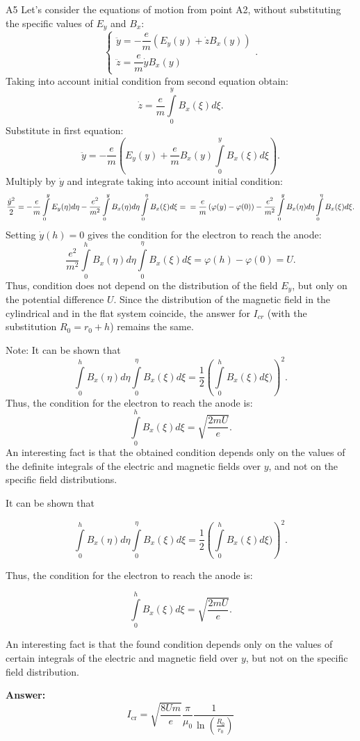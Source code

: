 \documentclass[11pt,a4paper]{article}
\begin{document}
\begin{solcard}{A5}
Let's consider the equations of motion from point A2, without substituting the specific values of $E_y$ and $B_x$: $$\begin{cases} \ddot{y} = -\dfrac{e}{m} \left(E_y(y) + \dot{z}B_x(y) \right) \\ \ddot{z} = \dfrac{e}{m} \dot{y}B_x(y) \end{cases}.$$ Taking into account initial condition from second equation obtain: $$\dot{z} = \frac{e}{m} \int \limits_0^y B_x(\xi) d\xi.$$Substitute in first equation: $$\ddot{y} = -\frac{e}{m}\left(E_y(y) + \frac{e}{m} B_x(y) \int \limits_0^y B_x(\xi) d\xi\right).$$Multiply by $\dot{y}$ and integrate taking into account initial condition: $$\frac{\dot{y}^2}{2} = -\frac{e}{m} \int \limits_0^y E_y(\eta) d\eta - \frac{e^2}{m^2} \int \limits_0^y B_x(\eta) d\eta \int \limits_0^\eta B_x(\xi) d\xi = \\ = \frac{e}{m}\left(\varphi(y) - \varphi(0)\right) - \frac{e^2}{m^2} \int \limits_0^y B_x(\eta) d\eta \int \limits_0^\eta B_x(\xi) d\xi.$$ Setting $\dot{y}(h) = 0$ gives the condition for the electron to reach the anode: $$\frac{e^2}{m^2} \int \limits_0^h B_x(\eta) d\eta \int \limits_0^\eta B_x(\xi) d\xi = \varphi(h) - \varphi(0) = U.$$Thus, condition does not depend on the distribution of the field $E_y$, but only on the potential difference $U$. Since the distribution of the magnetic field in the cylindrical and in the flat system coincide, the answer for $I_{cr}$ (with the substitution $R_0 = r_0 + h$) remains the same.


Note: It can be shown that $$\int \limits_0^h B_x(\eta) d\eta \int \limits_0^\eta B_x(\xi) d\xi = \frac{1}{2} \left(\int\limits_0^h B_x(\xi)d\xi)\right)^2.$$ Thus, the condition for the electron to reach the anode is: $$\int\limits_0^h B_x(\xi)d\xi = \sqrt{\frac{2mU}{e}}.$$ An interesting fact is that the obtained condition depends only on the values of the definite integrals of the electric and magnetic fields over $y$, and not on the specific field distributions.


It can be shown that


$$\int \limits_0^h B_x(\eta) d\eta \int \limits_0^\eta B_x(\xi) d\xi = \frac{1}{2} \left(\int\limits_0^h B_x(\xi)d\xi)\right)^2.$$


Thus, the condition for the electron to reach the anode is:


$$\int\limits_0^h B_x(\xi)d\xi = \sqrt{\frac{2mU}{e}}.$$


An interesting fact is that the found condition depends only on the values of certain integrals of the electric and magnetic field over $y$, but not on the specific field distribution.

\par\smallskip\noindent\textbf{Answer:} $$I_\text{cr} = \sqrt{\frac{8 U m}{e}} \frac{\pi}{\mu_0} \frac{1}{\ln\left(\frac{R_0}{r_0}\right)}$$
\end{solcard}
\end{document}
